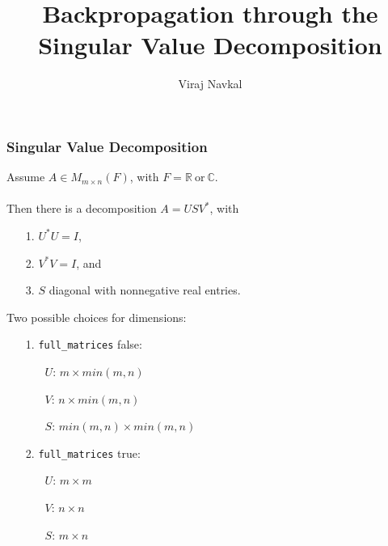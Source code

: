 \documentclass{beamer}
\title{Backpropagation through the Singular Value Decomposition}
\author{Viraj Navkal}
\date{}
\begin{document}
\frame{\titlepage}
\begin{frame}
  \frametitle{Singular Value Decomposition}
  Assume $A \in M_{m\times n}(F)$, with $F = \mathbb{R} \mathrm{\ or\ } \mathbb{C}$. \\~\\
  Then there is a decomposition $A = USV^*$, with
  \begin{itemize}
    \item[1.] $U^*U = I$,
    \item[2.] $V^*V = I$, and
    \item[3.] $S$ diagonal with nonnegative real entries.
  \end{itemize}
  \vspace{0.5cm}
  Two possible choices for dimensions:
  \begin{itemize}
  \item[1.] \texttt{full\_matrices} false:
    \begin{itemize}
    \item[$U$:] $m\times min(m, n)$
    \item[$V$:] $n\times min(m, n)$
    \item[$S$:] $min(m, n)\times min(m, n)$
    \end{itemize}
  \item[2.] \texttt{full\_matrices} true:
    \begin{itemize}
    \item[$U$:] $m\times m$
    \item[$V$:] $n\times n$
    \item[$S$:] $m\times n$
    \end{itemize}
  \end{itemize}
\end{frame}
\end{document}
